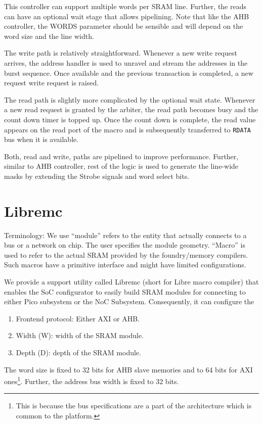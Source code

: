 \begin{enumerate}
    This controller can support multiple words per SRAM line. Further, the reads can have an optional wait stage that allows pipelining. Note that like the AHB controller, the WORDS parameter should be sensible and will depend on the word size and the line width.

    The write path is relatively straightforward. Whenever a new write request arrives, the address handler is used to unravel and stream the addresses in the burst sequence. Once available and the previous transaction is completed, a new request write request is raised. 
    
    The read path is slightly more complicated by the optional wait state. Whenever a new read request is granted by the arbiter, the read path becomes busy and the count down timer is topped up. Once the count down is complete, the read value appears on the read port of the macro and is subsequently transferred to \texttt{RDATA} bus when it is available. 

    Both, read and write, paths are pipelined to improve performance. Further, similar to AHB controller, rest of the logic is used to generate the line-wide masks by extending the Strobe signals and word select bits. 
\end{enumerate}

\section{Libremc} 

\begin{docnote}
Terminology: We use ``module'' refers to the entity that actually connects to a bus or a network on chip. The user specifies the module geometry. ``Macro'' is used to refer to the actual SRAM provided by the foundry/memory compilers. Such macros have a primitive interface and might have limited configurations. 
\end{docnote}

We provide a support utility called Libremc (short for Libre macro compiler) that enables the SoC configurator to easily build SRAM modules for connecting to either Pico subsystem or the NoC Subsystem. Consequently, it can configure the \begin{enumerate}
    \item Frontend protocol: Either AXI or AHB.
    \item Width (W): width of the SRAM module.
    \item Depth (D): depth of the SRAM module. 
\end{enumerate}
The word size is fixed to 32 bits for AHB slave memories and to 64 bits for AXI ones\footnote{This is because the bus specifications are a part of the architecture which is common to the platform.}. Further, the address bus width is fixed to 32 bits. 

